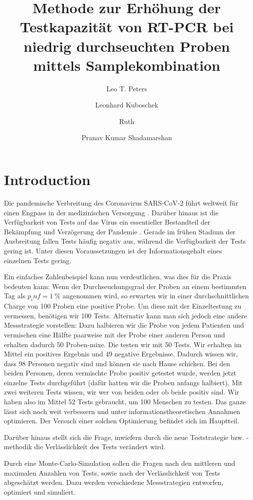 \documentclass[fleqn,10pt]{wlscirep}
\title{Methode zur Erhöhung der Testkapazität von RT-PCR bei niedrig durchseuchten Proben mittels Samplekombination}
\author[1,*]{Leo T. Peters}
\author[2]{Leonhard Kuboschek}
\author[1,2]{Ruth}
\author[2]{Pranav Kumar Shadamarshan}
\affil[1]{Affiliation, Department, City, Country}
\affil[2]{Affiliation, Department, City, Country}
\affil[*]{e-mail: leo.peters@tum.de}
\begin{document}
\flushbottom
\maketitle

\thispagestyle{empty}

\section*{Introduction}
Die pandemische Verbreitung des Coronavirus SARS-CoV-2 führt weltweit für einen Engpass in der medizinischen Versorgung \cite{Knappheit_med_versorgung}. Darüber hinaus ist die Verfügbarkeit von Tests auf das Virus ein essentieller Bestandteil der Bekämpfung und Verzögerung der Pandemie \cite{TestsBekämpfenCorona}. Gerade im frühen Stadium der Ausbreitung fallen Tests häufig negativ aus, während die Verfügbarkeit der Tests gering ist. Unter diesen Voraussetzungen ist der Informationsgehalt eines einzelnen Tests gering.

Ein einfaches Zahlenbeispiel kann nun verdeutlichen, was dies für die Praxis bedeuten kann: Wenn der Durchseuchungsgrad der Proben an einem bestimmten Tag als $p_inf = \SI{1}{\percent}$ angenommen wird, so erwarten wir in einer durchschnittlichen Charge von 100 Proben eine positive Probe. Um diese mit der Einzeltestung zu vermessen, benötigen wir 100 Tests. Alternativ kann man sich jedoch eine andere Messstrategie vorstellen: Dazu halbieren wir die Probe von jedem Patienten und vermischen eine Hälfte paarweise mit der Probe einer anderen Person und erhalten dadurch 50 Proben-mixe. Die testen wir mit 50 Tests. Wir erhalten im Mittel ein positives Ergebnis und 49 negative Ergebnisse. Dadurch wissen wir, dass 98 Personen negativ sind und können sie nach Hause schicken. Bei den beiden Personen, deren vermischte Probe positiv getestet wurde, werden jetzt einzelne Tests durchgeführt (dafür hatten wir die Proben anfangs halbiert). Mit zwei weiteren Tests wissen, wir wer von beiden oder ob beide positiv sind. Wir haben also im Mittel 52 Tests gebraucht, um 100 Menschen zu testen. Das ganze lässt sich noch weit verbessern und unter informationstheoretischen Annahmen optimieren. Der Versuch einer solchen Optimierung befindet sich im Hauptteil. 

Darüber hinaus stellt sich die Frage, inwiefern durch die neue Teststrategie bzw. -methodik die Verlässlichkeit des Tests verändert wird.

Durch eine Monte-Carlo-Simulation sollen die Fragen nach den mittleren und maximalen Anzahlen von Tests, sowie nach der Verlässlichkeit von Tests abgeschätzt werden.
Dazu werden verschiedene Messstrategien entworfen, optimiert und simuliert.
\end{document}
